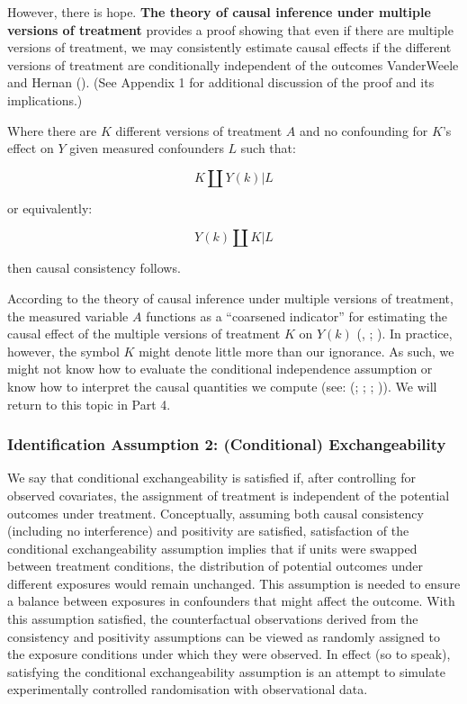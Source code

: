 \documentclass[
  singlecolumn]{article}
\begin{document}
However, there is hope. \textbf{The theory of causal inference under
multiple versions of treatment} provides a proof showing that even if
there are multiple versions of treatment, we may consistently estimate
causal effects if the different versions of treatment are conditionally
independent of the outcomes VanderWeele and Hernan
(). (See Appendix 1 for additional
discussion of the proof and its implications.)

Where there are \(K\) different versions of treatment \(A\) and no
confounding for \(K\)'s effect on \(Y\) given measured confounders \(L\)
such that:

\[
K \coprod Y(k) | L
\]

or equivalently:

\[
Y(k) \coprod K | L
\]

then causal consistency follows.

According to the theory of causal inference under multiple versions of
treatment, the measured variable \(A\) functions as a ``coarsened
indicator'' for estimating the causal effect of the multiple versions of
treatment \(K\) on \(Y(k)\) (, ;
). In
practice, however, the symbol \(K\) might denote little more than our
ignorance. As such, we might not know how to evaluate the conditional
independence assumption or know how to interpret the causal quantities
we compute (see: (;
;
;
)). We will return
to this topic in Part 4.

\subsubsection{Identification Assumption 2: (Conditional)
Exchangeability}\label{identification-assumption-2-conditional-exchangeability}

We say that conditional exchangeability is satisfied if, after
controlling for observed covariates, the assignment of treatment is
independent of the potential outcomes under treatment. Conceptually,
assuming both causal consistency (including no interference) and
positivity are satisfied, satisfaction of the conditional
exchangeability assumption implies that if units were swapped between
treatment conditions, the distribution of potential outcomes under
different exposures would remain unchanged. This assumption is needed to
ensure a balance between exposures in confounders that might affect the
outcome. With this assumption satisfied, the counterfactual observations
derived from the consistency and positivity assumptions can be viewed as
randomly assigned to the exposure conditions under which they were
observed. In effect (so to speak), satisfying the conditional
exchangeability assumption is an attempt to simulate experimentally
controlled randomisation with observational data.
\end{document}
